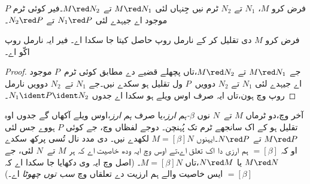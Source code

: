 \documentclass[../../../include/open-logic-section]{subfiles}
\begin{document}

\begin{thm}
فرض کرو $M$، $N_1$ تے $N_2$ ٹرم نیں جِنہاں لئی $M \red N_1$
تے $M \red N_2$۔فیر کوئی ٹرم $P$ موجود اے جیہدے لئی
$N_1 \red P$ تے $N_2 \red P$۔
\end{thm}

\begin{cor}
فرض کرو $M$ دی تقلیل کر کے نارمل روپ حاصل کیتا جا سکدا اے۔
فیر ایہ نارمل روپ اکّو اے۔
\end{cor}

\begin{proof}
جے $M \red N_1$ تے $M \red N_2$،تاں پچھلے قضیے دے مطابق
کوئی ٹرم~$P$ موجود اے جیہدے لئی $N_1$ تے $N_2$ دوویں~$P$ ول تقلیل ہو
سکدے نیں۔جے $N_1$ تے~$N_2$ دوویں نارمل روپ وچ ہون،تاں ایہ
صرف اوس ویلے ہو سکدا اے جدوں $N_1 \ident P \ident N_2$۔
\end{proof}

آخر وچ،دو ٹرماں $M$ تے~$N$ نوں
\emph{$\beta$-ہم ارز}،یا صرف \emph{ہم ارز}،اوس ویلے آکھاں گے
جدوں اوہ تقلیل ہو کے اک سانجھے ٹرم تک پُہنچن۔ دوجے لفظاں وچ، جے کوئی
$P$ ہووے جس لئی $M \red P$ تے $N \red P$۔ایہنوں
$M \equal[\beta] N$ لکھدے نیں۔ دی
مدد نال تُسی پرکھ سکدے او کہ $\equal[\beta]$ ہم ارزی دا اک
تعلق اے،تے اوس وچ ایہ ودھ خاصیت اے کہ ہر $M$ تے~$N$ لئی،
جے $M \red N$ یا $N \red M$،تاں $M \equal[\beta] N$۔
(اصل وچ ایہ وی دکھایا جا سکدا اے کہ $\equal[\beta]$ ایس خاصیت
والے ہم ارزیت دے تعلقاں وچ \emph{سب توں چھوٹا} اے۔)
\end{document}
